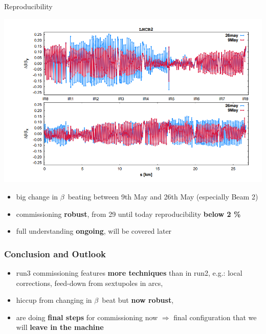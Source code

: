 \documentclass[4pt,usenames,dvipsnames,aspectratio=169,table]{beamer}
\newcommand{\highl}[1]{\textbf{#1}}
\begin{document}
\begin{frame}{Reproducibility}

    \includegraphics[width=0.6\linewidth]{images/reproducibility/B2_26May_9May.png}

\begin{itemize}
    \item big change in $\beta$~beating between 9th May and 26th May (especially Beam 2)
    \item  commissioning \highl{robust}, from 29 until today reproducibility \highl{below 2 \%}
    \item  full understanding \highl{ongoing},  will be covered later
\end{itemize}

    
\end{frame}


\begin{frame}
    \frametitle{Conclusion and Outlook}

    \begin{itemize}
        \item run3 commissioning features \highl{more techniques} than in run2, e.g.:
        local corrections,
        feed-down from sextupoles in arcs, 
        \item hiccup from changing in $\beta$~beat but \highl{now robust},
        \item are doing \highl{final steps} for commissioning now
        $\Rightarrow$ final configuration that we will \highl{leave in the machine}
    \end{itemize}

\end{frame}


\end{document}
